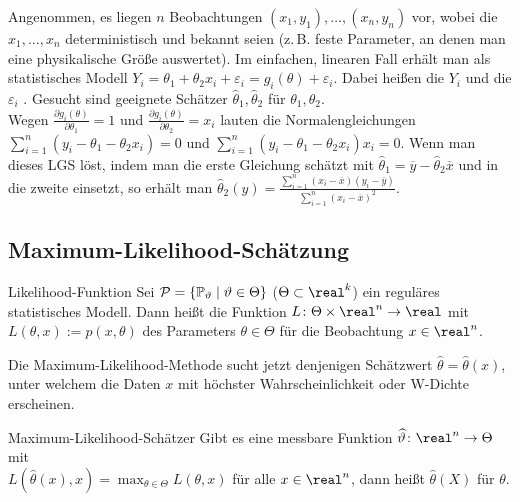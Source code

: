 \begin{Bsp}
    Angenommen, es liegen $n$ Beobachtungen $(x_1, y_1), \dotsc, (x_n, y_n)$ vor, wobei
    die $x_1, \dotsc, x_n$ deterministisch und bekannt seien
    (z.\,B. feste Parameter, an denen man eine physikalische Größe auswertet).
    Im einfachen, linearen Fall erhält man als statistisches Modell
    $Y_i = \theta_1 + \theta_2 x_i + \varepsilon_i = g_i(\theta) + \varepsilon_i$.
    Dabei heißen die $Y_i$  und die $\varepsilon_i$ .
    Gesucht sind geeignete Schätzer $\widehat{\theta}_1, \widehat{\theta}_2$ für
    $\theta_1, \theta_2$.\\
    Wegen $\frac{\partial g_i(\theta)}{\partial \theta_1} = 1$ und
    $\frac{\partial g_i(\theta)}{\partial \theta_2} = x_i$ lauten die Normalengleichungen
    $\sum_{i=1}^n (y_i - \theta_1 - \theta_2 x_i) = 0$ und
    $\sum_{i=1}^n (y_i - \theta_1 - \theta_2 x_i) x_i = 0$.
    Wenn man dieses LGS löst, indem man die erste Gleichung schätzt mit
    $\widehat{\theta}_1 = \overline{y} - \widehat{\theta}_2 \overline{x}$ und in die zweite
    einsetzt, so erhält man
    $\widehat{\theta}_2(y) = \frac{\sum_{i=1}^n (x_i - \overline{x}) (y_i - \overline{y})}
    {\sum_{i=1}^n (x_i - \overline{x})^2}$.
\end{Bsp}


\subsection{%
    Maximum-Likelihood-Schätzung%
}

\begin{Def}{Likelihood-Funktion}
    Sei $\mathcal{P} = \{\mathbb{P}_\vartheta \;|\; \vartheta \in \Theta\}$ ($\Theta \subset \real^k$) ein
    reguläres statistisches Modell.
    Dann heißt die Funktion $L\colon \Theta \times \real^n \rightarrow \real$ mit
    $L(\theta, x) := p(x, \theta)$  des Parameters $\theta \in \Theta$
    für die Beobachtung $x \in \real^n$.
\end{Def}

\begin{Bem}
    Die Maximum-Likelihood-Methode sucht jetzt denjenigen Schätzwert
    $\widehat{\theta} = \widehat{\theta}(x)$, unter welchem die Daten $x$ mit höchster
    Wahrscheinlichkeit oder W-Dichte erscheinen.
\end{Bem}

\begin{Def}{Maximum-Likelihood-Schätzer}
    Gibt es eine messbare Funktion $\widehat{\theta}\colon \real^n \rightarrow \Theta$ mit\\
    $L(\widehat{\theta}(x), x) = \max_{\theta \in \Theta} L(\theta, x)$ für alle $x \in \real^n$,
    dann heißt $\widehat{\theta}(X)$ 
    für $\theta$.
\end{Def}

